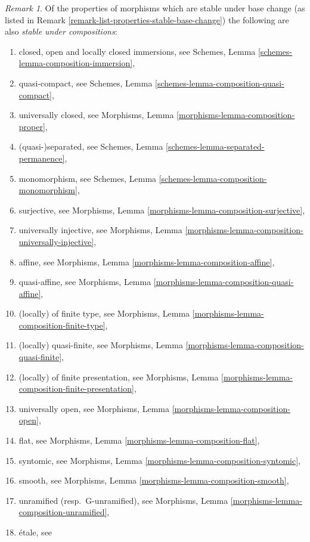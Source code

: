 \documentclass{stacks-project}
\theoremstyle{plain}
\theoremstyle{definition}
\theoremstyle{remark}
\newtheorem{remark}[subsection]{Remark}
\numberwithin{equation}{subsection}
\begin{document}
\begin{remark}
\label{remark-list-properties-stable-composition}
Of the properties of morphisms which are stable under base change
(as listed in
Remark \ref{remark-list-properties-stable-base-change})
the following are also {\it stable under compositions}:
\begin{enumerate}
\item closed, open and locally closed immersions, see
Schemes, Lemma \ref{schemes-lemma-composition-immersion},
\item quasi-compact, see
Schemes, Lemma \ref{schemes-lemma-composition-quasi-compact},
\item universally closed, see
Morphisms, Lemma \ref{morphisms-lemma-composition-proper},
\item (quasi-)separated, see
Schemes, Lemma \ref{schemes-lemma-separated-permanence},
\item monomorphism, see
Schemes, Lemma \ref{schemes-lemma-composition-monomorphism},
\item surjective, see
Morphisms, Lemma \ref{morphisms-lemma-composition-surjective},
\item universally injective, see
Morphisms, Lemma \ref{morphisms-lemma-composition-universally-injective},
\item affine, see
Morphisms, Lemma \ref{morphisms-lemma-composition-affine},
\item quasi-affine, see
Morphisms, Lemma \ref{morphisms-lemma-composition-quasi-affine},
\item (locally) of finite type, see
Morphisms, Lemma \ref{morphisms-lemma-composition-finite-type},
\item (locally) quasi-finite, see
Morphisms, Lemma \ref{morphisms-lemma-composition-quasi-finite},
\item (locally) of finite presentation, see
Morphisms, Lemma \ref{morphisms-lemma-composition-finite-presentation},
\item universally open, see
Morphisms, Lemma \ref{morphisms-lemma-composition-open},
\item flat, see
Morphisms, Lemma \ref{morphisms-lemma-composition-flat},
\item syntomic, see
Morphisms, Lemma \ref{morphisms-lemma-composition-syntomic},
\item smooth, see
Morphisms, Lemma \ref{morphisms-lemma-composition-smooth},
\item unramified (resp.\ G-unramified), see
Morphisms, Lemma \ref{morphisms-lemma-composition-unramified},
\item \'etale, see

\end{enumerate}
\end{remark}
\end{document}
